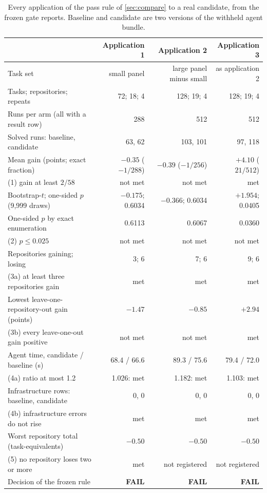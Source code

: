 \begin{table}[!htb]
\centering
\caption{Every application of the pass rule of \cref{sec:compare} to a real candidate, from the frozen gate reports. Baseline and candidate are two versions of the withheld agent bundle.}\label{tab:s-gates}
\footnotesize
\begin{tabular}{lrrr}
\toprule
 & Application 1 & Application 2 & Application 3 \\
\midrule
Task set & small panel & large panel minus small & as application 2 \\
Tasks; repositories; repeats & 72; 18; 4 & 128; 19; 4 & 128; 19; 4 \\
Runs per arm (all with a result row) & 288 & 512 & 512 \\
Solved runs: baseline, candidate & 63, 62 & 103, 101 & 97, 118 \\
Mean gain (points; exact fraction) & ${-}0.35$ (${-}1/288$) & ${-}0.39$ (${-}1/256$) & ${+}4.10$ ($21/512$) \\
\quad (1) gain at least $2/58$ & not met & not met & met \\
Bootstrap-$t$; one-sided $p$ (9{,}999 draws) & ${-}0.175$; 0.6034 & ${-}0.366$; 0.6034 & ${+}1.954$; 0.0405 \\
One-sided $p$ by exact enumeration & 0.6113 & 0.6067 & 0.0360 \\
\quad (2) $p \le 0.025$ & not met & not met & not met \\
Repositories gaining; losing & 3; 6 & 7; 6 & 9; 6 \\
\quad (3a) at least three repositories gain & met & met & met \\
Lowest leave-one-repository-out gain (points) & ${-}1.47$ & ${-}0.85$ & ${+}2.94$ \\
\quad (3b) every leave-one-out gain positive & not met & not met & met \\
Agent time, candidate / baseline (s) & 68.4 / 66.6 & 89.3 / 75.6 & 79.4 / 72.0 \\
\quad (4a) ratio at most 1.2 & 1.026: met & 1.182: met & 1.103: met \\
Infrastructure rows: baseline, candidate & 0, 0 & 0, 0 & 0, 0 \\
\quad (4b) infrastructure errors do not rise & met & met & met \\
Worst repository total (task-equivalents) & ${-}0.50$ & ${-}0.50$ & ${-}0.50$ \\
\quad (5) no repository loses two or more & met & not registered & not registered \\
\midrule
Decision of the frozen rule & \textbf{FAIL} & \textbf{FAIL} & \textbf{FAIL} \\
\bottomrule
\end{tabular}
\end{table}
